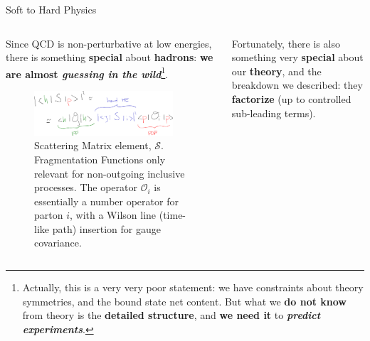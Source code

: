 \documentclass[9pt]{beamer}
\begin{document}
\begin{frame}{Soft to Hard Physics}
    \vspace*{25pt}
    \begin{columns}
        \begin{column}{0.5\textwidth}
            Since QCD is non-perturbative at low energies, there is something
            \textbf{special} about \textbf{hadrons}: \textbf{we are almost
            \textit{guessing in the wild}}\footnote{
                Actually, this is a very very poor statement: we have
                constraints about theory symmetries, and the bound state net
                content. But what we \textbf{do not know} from theory is the
                \textbf{\alert{detailed structure}}, and \textbf{we need it} to
                \textit{\textbf{predict experiments}}.
            }.
            \vspace*{15pt}
            \begin{figure}
                \centering
                \includegraphics[width=0.9\textwidth]{hadronic-obs}
                \vspace*{10pt}
                \caption{
                    Scattering Matrix element, $\mathcal{S}$.
                    {
                        \footnotesize Fragmentation Functions only relevant for
                        non-outgoing inclusive processes.\newline
                        The operator $\mathcal{O}_i$ is essentially a number
                        operator for parton $i$, with a Wilson line (time-like
                        path) insertion for gauge covariance.
                    }
                }
            \end{figure}
        \end{column}
        \begin{column}{0.5\textwidth}
            Fortunately, there is also something very \textbf{special} about
            our \textbf{theory}, and the breakdown we described: they
            \alert{\textbf{factorize}} (up to controlled sub-leading terms).
            \vspace*{15pt}


\end{column}
\end{columns}
\end{frame}
\end{document}
